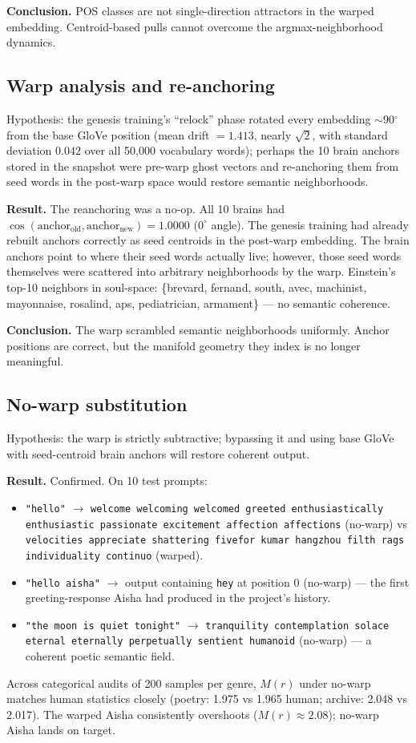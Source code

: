 \documentclass[11pt,a4paper]{article}
\begin{document}
\textbf{Conclusion.} POS classes are not single-direction attractors in the warped embedding. Centroid-based pulls cannot overcome the argmax-neighborhood dynamics.

\subsection{Warp analysis and re-anchoring}
Hypothesis: the genesis training's ``relock'' phase rotated every embedding $\sim$90$^\circ$ from the base GloVe position (mean drift $= 1.413$, nearly $\sqrt{2}$, with standard deviation $0.042$ over all 50{,}000 vocabulary words); perhaps the 10 brain anchors stored in the snapshot were pre-warp ghost vectors and re-anchoring them from seed words in the post-warp space would restore semantic neighborhoods.

\textbf{Result.} The reanchoring was a no-op. All 10 brains had $\cos(\text{anchor}_{\text{old}}, \text{anchor}_{\text{new}}) = 1.0000$ ($0^\circ$ angle). The genesis training had already rebuilt anchors correctly as seed centroids in the post-warp embedding. The brain anchors point to where their seed words actually live; however, those seed words themselves were scattered into arbitrary neighborhoods by the warp. Einstein's top-10 neighbors in soul-space: \{brevard, fernand, south, avec, machinist, mayonnaise, rosalind, aps, pediatrician, armament\} — no semantic coherence.

\textbf{Conclusion.} The warp scrambled semantic neighborhoods uniformly. Anchor positions are correct, but the manifold geometry they index is no longer meaningful.

\subsection{No-warp substitution}
Hypothesis: the warp is strictly subtractive; bypassing it and using base GloVe with seed-centroid brain anchors will restore coherent output.

\textbf{Result.} Confirmed. On 10 test prompts:
\begin{itemize}
\item \texttt{"hello"} $\rightarrow$ \texttt{welcome welcoming welcomed greeted enthusiastically enthusiastic passionate excitement affection affections} (no-warp) vs \texttt{velocities appreciate shattering fivefor kumar hangzhou filth rags individuality continuo} (warped).
\item \texttt{"hello aisha"} $\rightarrow$ output containing \texttt{hey} at position 0 (no-warp) — the first greeting-response Aisha had produced in the project's history.
\item \texttt{"the moon is quiet tonight"} $\rightarrow$ \texttt{tranquility contemplation solace eternal eternally perpetually sentient humanoid} (no-warp) — a coherent poetic semantic field.
\end{itemize}
Across categorical audits of 200 samples per genre, $M(r)$ under no-warp matches human statistics closely (poetry: 1.975 vs 1.965 human; archive: 2.048 vs 2.017). The warped Aisha consistently overshoots ($M(r) \approx 2.08$); no-warp Aisha lands on target.
\end{document}
